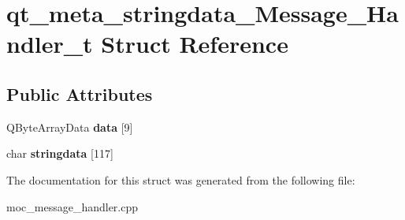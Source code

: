 \section{qt\-\_\-meta\-\_\-stringdata\-\_\-\-Message\-\_\-\-Handler\-\_\-t Struct Reference}
\label{structqt__meta__stringdata___message___handler__t}
\subsection*{Public Attributes}
\begin{DoxyCompactItemize}
\item 
Q\-Byte\-Array\-Data {\bfseries data} [9]\label{structqt__meta__stringdata___message___handler__t_ac71c3bf20872ed0a82a95e157143d8ee}

\item 
char {\bfseries stringdata} [117]\label{structqt__meta__stringdata___message___handler__t_a9f65437ee106bdf2d3a61ac1f7dbfd12}

\end{DoxyCompactItemize}


The documentation for this struct was generated from the following file\-:\begin{DoxyCompactItemize}
\item 
moc\-\_\-message\-\_\-handler.\-cpp\end{DoxyCompactItemize}
